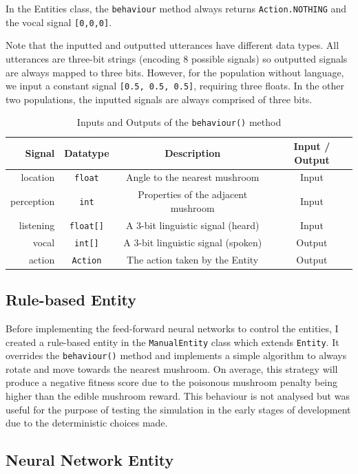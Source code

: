 \documentclass[12pt,a4paper,twoside,openright]{report}
\begin{document}
In the Entities class, the \texttt{behaviour} method always returns \texttt{Action.NOTHING} and the vocal signal \texttt{[0,0,0]}.

Note that the inputted and outputted utterances have different data types. All utterances are three-bit strings (encoding 8 possible signals) so outputted signals are always mapped to three bits. However, for the population without language, we input a constant signal \texttt{[0.5, 0.5, 0.5]}, requiring three floats. In the other two populations, the inputted  signals are always comprised of three bits.

\begin{table}[t]
\centering
 \begin{tabular}{ r | c | c | c}
 \bf{Signal} & \bf{Datatype} & \bf{Description} & \bf{Input / Output} \\ [0.5ex] 
 \hline
location & \texttt{float} & Angle to the nearest mushroom & Input \\
perception & \texttt{int} & Properties of the adjacent mushroom & Input \\
listening & \texttt{float[]} & A 3-bit linguistic signal (heard) & Input \\
vocal & \texttt{int[]} & A 3-bit linguistic signal (spoken) & Output \\
action & \texttt{Action} & The action taken by the Entity & Output \\
\end{tabular}
\caption{Inputs and Outputs of the \texttt{behaviour()} method}
\label{table:behaviour}
\end{table}

\subsection{Rule-based Entity}

Before implementing the feed-forward neural networks to control the entities, I created a rule-based entity in the \texttt{ManualEntity} class which extends \texttt{Entity}. It overrides the \texttt{behaviour()} method and implements a simple algorithm to always rotate and move towards the nearest mushroom. On average, this strategy will produce a negative fitness score due to the poisonous mushroom penalty being higher than the edible mushroom reward. This behaviour is not analysed but was useful for the purpose of testing the simulation in the early stages of development due to the deterministic choices made.

\subsection{Neural Network Entity}
\end{document}
